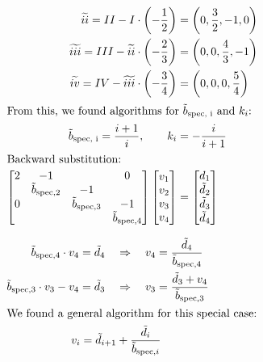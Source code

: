 \documentclass[12pt]{article}
\newcommand{\RNum}[1]{\uppercase\expandafter{\romannumeral #1\relax}}
\begin{document}
\begin{align*}
    \widetilde{\RNum{2}} = II - I \cdot \left( - \frac{1}{2} \right) &= \left( 0, \frac{3}{2}, -1, 0 \right)\\
    \widetilde{\RNum{3}} = III - \widetilde{\RNum{2}} \cdot \left( - \frac{2}{3} \right) &= \left( 0, 0, \frac{4}{3}, -1 \right) \\
    \widetilde{\RNum{4}} = IV - \widetilde{\RNum{3}} \cdot \left( - \frac{3}{4} \right) &= \left(0, 0, 0, \frac{5}{4} \right) \\
    \intertext{From this, we found algorithms for \( \tilde{b}_{\text{spec, i}} \) and $k_i$: } \smallskip
    \tilde{b}_{\text{spec, i}} = \frac{i+1}{i}, \quad \quad k_i &= - \frac{i}{i+1}
    \\
    \intertext{Backward substitution:}
    \begin{bmatrix}
        2 & -1                      &                         & 0 \\
          & \tilde{b}_{\text{spec}, 2} & -1 \\
        0 &                         & \tilde{b}_{\text{spec}, 3} & -1 \\
          &                         &                         & \tilde{b}_{\text{spec}, 4}
    \end{bmatrix}
    \begin{bmatrix}
        v_1 \\
        v_2 \\
        v_3 \\
        v_4
    \end{bmatrix}
    &=
    \begin{bmatrix}
        d_1 \\
        \tilde{d}_2 \\
        \tilde{d}_3 \\
        \tilde{d}_4
    \end{bmatrix}
\end{align*}

\begin{align*}
    \tilde{b}_{\text{spec}, 4} \cdot v_4 = \tilde{d}_4 \quad &\Rightarrow \quad v_4 = \frac{\tilde{d}_4}{\tilde{b}_{\text{spec}, 4}}  \\
    \tilde{b}_{\text{spec}, 3} \cdot v_3 - v_4 = \tilde{d}_3 \quad &\Rightarrow \quad v_3 = \frac{\tilde{d}_3 + v_4}{\tilde{b}_{\text{spec}, 3}} \\
    \intertext{We found a general algorithm for this special case:}
    v_i = \tilde{d}_{i+1} &+ \frac{\tilde{d}_i}{\tilde{b}_{\text{spec}, i}}
\end{align*}
\end{document}
